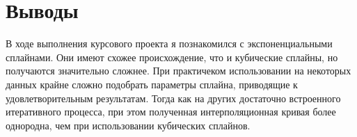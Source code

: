 \section{Выводы}
В ходе выполнения курсового проекта я познакомился с экспоненциальными сплайнами. Они имеют схожее происхождение, что и кубические сплайны, но получаются значительно сложнее. При практичеком использовании на некоторых данных крайне сложно подобрать параметры сплайна, приводящие к удовлетворительным результатам. Тогда как на других достаточно встроенного итеративного процесса, при этом полученная интерполяционная кривая более однородна, чем при использовании кубических сплайнов.

\pagebreak
